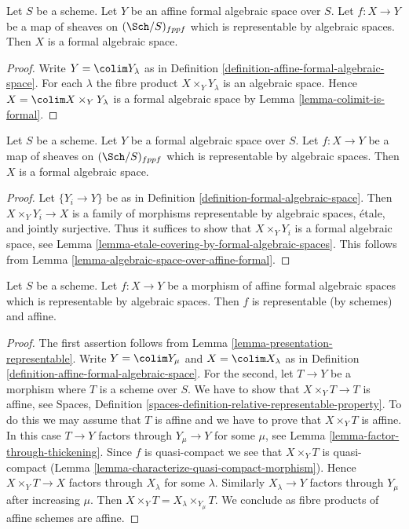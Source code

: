 \begin{lemma}
\label{lemma-algebraic-space-over-affine-formal}
Let $S$ be a scheme. Let $Y$ be an affine formal algebraic space over $S$.
Let $f : X \to Y$ be a map of sheaves on $(\Sch/S)_{fppf}$ which is
representable by algebraic spaces. Then $X$ is a formal
algebraic space.
\end{lemma}

\begin{proof}
Write $Y = \colim Y_\lambda$ as in
Definition \ref{definition-affine-formal-algebraic-space}.
For each $\lambda$ the fibre product
$X \times_Y Y_\lambda$ is an algebraic space.
Hence $X = \colim X \times_Y Y_\lambda$ is a formal
algebraic space by Lemma \ref{lemma-colimit-is-formal}.
\end{proof}

\begin{lemma}
\label{lemma-representable-by-algebraic-spaces}
Let $S$ be a scheme. Let $Y$ be a formal algebraic space over $S$.
Let $f : X \to Y$ be a map of sheaves on $(\Sch/S)_{fppf}$ which is
representable by algebraic spaces. Then $X$ is a formal
algebraic space.
\end{lemma}

\begin{proof}
Let $\{Y_i \to Y\}$ be as in
Definition \ref{definition-formal-algebraic-space}.
Then $X \times_Y Y_i \to X$ is a family of morphisms
representable by algebraic spaces, \'etale, and jointly
surjective. Thus it suffices to show that
$X \times_Y Y_i$ is a formal algebraic space, see
Lemma \ref{lemma-etale-covering-by-formal-algebraic-spaces}.
This follows from Lemma \ref{lemma-algebraic-space-over-affine-formal}.
\end{proof}

\begin{lemma}
\label{lemma-affine-representable-by-algebraic-spaces}
Let $S$ be a scheme. Let $f : X \to Y$ be a morphism of
affine formal algebraic spaces which is representable by
algebraic spaces. Then $f$ is representable (by schemes) and affine.
\end{lemma}

\begin{proof}
The first assertion follows from Lemma \ref{lemma-presentation-representable}.
Write $Y = \colim Y_\mu$ and $X = \colim X_\lambda$ as in
Definition \ref{definition-affine-formal-algebraic-space}.
For the second, let $T \to Y$ be a morphism where $T$ is a scheme
over $S$. We have to show that $X \times_Y T \to T$ is affine, see
Spaces, Definition \ref{spaces-definition-relative-representable-property}.
To do this we may assume that $T$ is affine and we have to prove
that $X \times_Y T$ is affine. In this case $T \to Y$ factors
through $Y_\mu \to Y$ for some $\mu$, see
Lemma \ref{lemma-factor-through-thickening}.
Since $f$ is quasi-compact we see that $X \times_Y T$ is
quasi-compact (Lemma \ref{lemma-characterize-quasi-compact-morphism}).
Hence $X \times_Y T \to X$ factors through $X_\lambda$ for some
$\lambda$. Similarly $X_\lambda \to Y$ factors through $Y_\mu$
after increasing $\mu$. Then
$X \times_Y T = X_\lambda \times_{Y_\mu} T$.
We conclude as fibre products of affine schemes are affine.
\end{proof}

